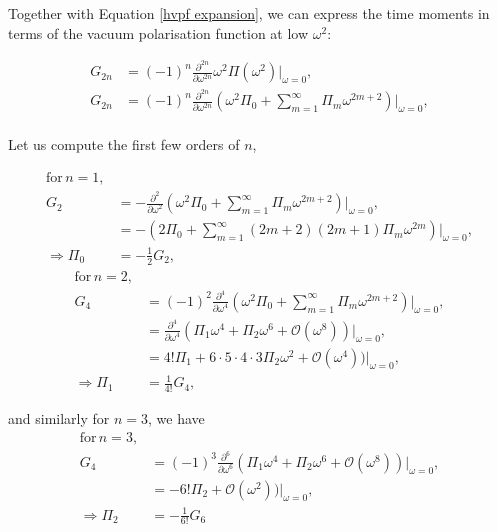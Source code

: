 \documentclass{article}
\numberwithin{equation}{section} %
\begin{document}
Together with Equation \ref{hvpf expansion}, we can express the time moments in terms of the vacuum polarisation function at low $\omega^2$:

\begin{equation}
\begin{split}
G_{2n}&=  (-1)^{n} \frac{\partial^{2n}}{\partial \omega^{2n}} \omega^2 \Pi(\omega^2)\bigg \vert_{\omega=0} ,\\
G_{2n}&=  (-1)^{n} \frac{\partial^{2n}}{\partial \omega^{2n}} (\omega^2 \Pi_0 + \sum_{m=1}^\infty \Pi_m \omega^{2m+2})\bigg \vert_{\omega=0} ,\\
\end{split}
\end{equation}

Let us compute the first few orders of $n$,

\begin{equation}
\begin{split}
\mathrm{for}\, n=1,&\\
G_2 &= -\frac{\partial^{2}}{\partial \omega^{2}} (\omega^2 \Pi_0 + \sum_{m=1}^\infty \Pi_m \omega^{2m+2})\bigg \vert_{\omega=0} ,\\
&= -(2\Pi_0 + \sum_{m=1}^\infty (2m+2)(2m+1)\Pi_m \omega^{2m})\bigg \vert_{\omega=0} ,\\
\label{pi0g2}\Rightarrow \Pi_0 &= -\frac{1}{2}G_2,
\end{split}
\end{equation}
\begin{equation}
\begin{split}
\mathrm{for}\, n=2,&\\
G_4 &= (-1)^2\frac{\partial^{4}}{\partial \omega^{4}} (\omega^2 \Pi_0 + \sum_{m=1}^\infty \Pi_m \omega^{2m+2})\bigg \vert_{\omega=0} ,\\
&=  \frac{\partial^{4}}{\partial \omega^{4}}(\Pi_1 \omega^{4} + \Pi_2 \omega^{6} + \mathcal{O}(\omega^8))\bigg \vert_{\omega=0} ,\\
&= 4!\Pi_1 + 6\cdot 5\cdot 4\cdot 3\Pi_2 \omega^{2} + \mathcal{O}(\omega^4))\bigg \vert_{\omega=0} ,\\
\Rightarrow \Pi_1 &= \frac{1}{4!}G_4,
\end{split}
\end{equation}

\noindent and similarly for $n=3$, we have
\begin{equation}
\begin{split}
\mathrm{for}\, n=3,&\\
G_4 &= (-1)^3\frac{\partial^{6}}{\partial \omega^{6}} (\Pi_1 \omega^{4} + \Pi_2 \omega^{6} + \mathcal{O}(\omega^8))\bigg \vert_{\omega=0} ,\\
&=-6!\Pi_2 + \mathcal{O}(\omega^2))\bigg \vert_{\omega=0} ,\\
\Rightarrow \Pi_2 &= -\frac{1}{6!}G_6
\end{split}
\end{equation}
\end{document}
